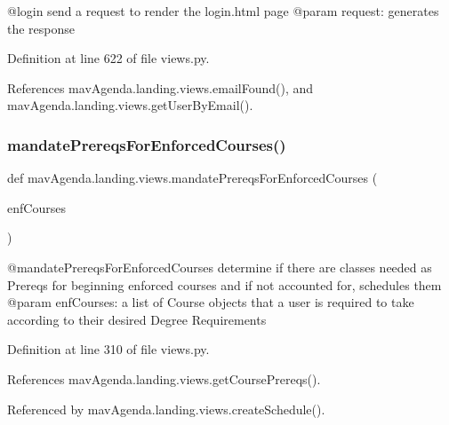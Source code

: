 \begin{DoxyVerb}@login send a request to render the login.html page
@param request: generates the response
\end{DoxyVerb}
 

Definition at line 622 of file views.\+py.



References mav\+Agenda.\+landing.\+views.\+email\+Found(), and mav\+Agenda.\+landing.\+views.\+get\+User\+By\+Email().

\mbox{\label{namespacemavAgenda_1_1landing_1_1views_abecce7b2d73935c98176d678866bfa1a}} 
\subsubsection{\texorpdfstring{mandate\+Prereqs\+For\+Enforced\+Courses()}{mandatePrereqsForEnforcedCourses()}}
{\footnotesize\ttfamily def mav\+Agenda.\+landing.\+views.\+mandate\+Prereqs\+For\+Enforced\+Courses (\begin{DoxyParamCaption}\item[{}]{enf\+Courses }\end{DoxyParamCaption})}

\begin{DoxyVerb}@mandatePrereqsForEnforcedCourses determine if there are classes needed as Prereqs for beginning enforced courses and if not accounted for, schedules them
@param enfCourses: a list of Course objects that a user is required to take according to their desired Degree Requirements
\end{DoxyVerb}
 

Definition at line 310 of file views.\+py.



References mav\+Agenda.\+landing.\+views.\+get\+Course\+Prereqs().



Referenced by mav\+Agenda.\+landing.\+views.\+create\+Schedule().

\mbox{\label{namespacemavAgenda_1_1landing_1_1views_afd6c90b52229e71e7b6fea7c5798cef7}} 
